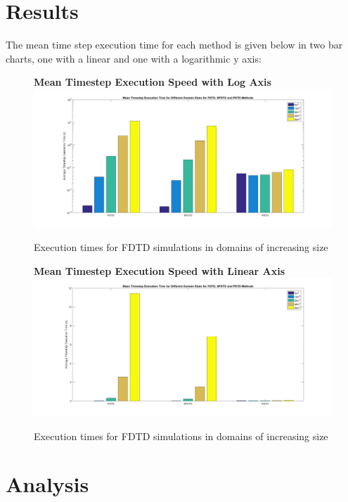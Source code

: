 \section{Results}
The mean time step execution time for each method is given below in two bar charts, one with a linear and one with a logarithmic y axis: \\
\begin{figure}[H]
\centering
	\textbf{Mean Timestep Execution Speed with Log Axis}
  \includegraphics[width=\textwidth]{./graphics/speedTestBar.png}
  \caption{Execution times for FDTD simulations in domains of increasing size}
\end{figure}
\begin{figure}[H]
\centering
\textbf{Mean Timestep Execution Speed with Linear Axis}
  \includegraphics[width=\textwidth]{./graphics/speedTestBarlin.png}
  \caption{Execution times for FDTD simulations in domains of increasing size}
\end{figure}

\section{Analysis}

